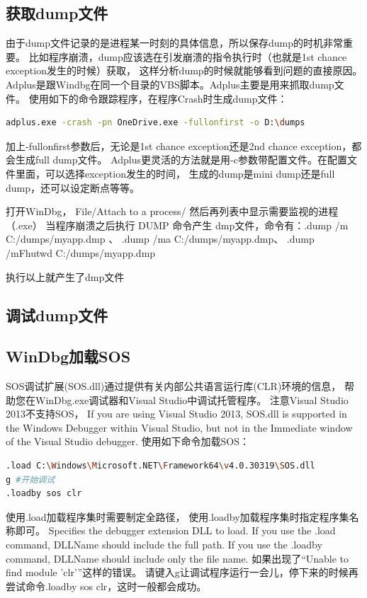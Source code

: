 \documentclass{book}
\begin{document}
\subsection{获取dump文件}

由于dump文件记录的是进程某一时刻的具体信息，所以保存dump的时机非常重要。
比如程序崩溃，dump应该选在引发崩溃的指令执行时（也就是1st chance exception发生的时候）获取，
这样分析dump的时候就能够看到问题的直接原因。
Adplus是跟Windbg在同一个目录的VBS脚本。Adplus主要是用来抓取dump文件。
使用如下的命令跟踪程序，在程序Crash时生成dump文件：

\begin{lstlisting}[language=Bash]
adplus.exe -crash -pn OneDrive.exe -fullonfirst -o D:\dumps
\end{lstlisting}

加上-fullonfirst参数后，无论是1st chance exception还是2nd chance exception，都会生成full dump文件。
Adplus更灵活的方法就是用-c参数带配置文件。在配置文件里面，可以选择exception发生的时间，
生成的dump是mini dump还是full dump，还可以设定断点等等。

打开WinDbg， File/Attach to a process/  然后再列表中显示需要监视的进程（.exe）
当程序崩溃之后执行 DUMP 命令产生 dmp文件，命令有：.dump /m C:/dumps/myapp.dmp 、
.dump /ma C:/dumps/myapp.dmp、 .dump /mFhutwd C:/dumps/myapp.dmp

执行以上就产生了dmp文件

\subsection{调试dump文件}
\subsection{WinDbg加载SOS}

SOS调试扩展(SOS.dll)通过提供有关内部公共语言运行库(CLR)环境的信息，
帮助您在WinDbg.exe调试器和Visual Studio中调试托管程序。
注意Visual Studio 2013不支持SOS，
If you are using Visual Studio 2013, 
SOS.dll is supported in the Windows Debugger within Visual Studio, but not in the Immediate window of the Visual Studio debugger.
使用如下命令加载SOS：

\begin{lstlisting}[language=Bash]
.load C:\Windows\Microsoft.NET\Framework64\v4.0.30319\SOS.dll
g #开始调试
.loadby sos clr
\end{lstlisting}

使用.load加载程序集时需要制定全路径，
使用.loadby加载程序集时指定程序集名称即可。
Specifies the debugger extension DLL to load. 
If you use the .load command, DLLName should include the full path. 
If you use the .loadby command, DLLName should include only the file name. 
如果出现了“Unable to find module 'clr'”这样的错误。
请键入g让调试程序运行一会儿，停下来的时候再尝试命令.loadby sos clr，这时一般都会成功。
\end{document}
